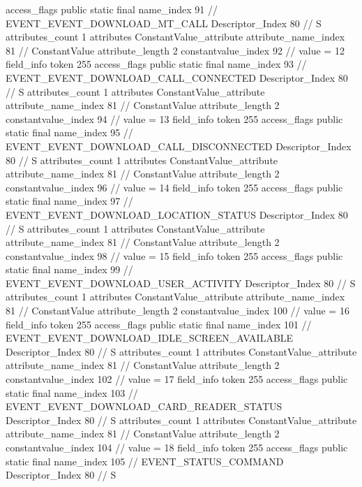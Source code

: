 {{{{{				access_flags	public static final
				name_index	91		// EVENT_EVENT_DOWNLOAD_MT_CALL
				Descriptor_Index	80		// S
				attributes_count	1
				attributes {
				ConstantValue_attribute {
					attribute_name_index	81		// ConstantValue
					attribute_length	2
					constantvalue_index	92		// value = 12
				}
				}
			}
			field_info {
				token	255
				access_flags	public static final
				name_index	93		// EVENT_EVENT_DOWNLOAD_CALL_CONNECTED
				Descriptor_Index	80		// S
				attributes_count	1
				attributes {
				ConstantValue_attribute {
					attribute_name_index	81		// ConstantValue
					attribute_length	2
					constantvalue_index	94		// value = 13
				}
				}
			}
			field_info {
				token	255
				access_flags	public static final
				name_index	95		// EVENT_EVENT_DOWNLOAD_CALL_DISCONNECTED
				Descriptor_Index	80		// S
				attributes_count	1
				attributes {
				ConstantValue_attribute {
					attribute_name_index	81		// ConstantValue
					attribute_length	2
					constantvalue_index	96		// value = 14
				}
				}
			}
			field_info {
				token	255
				access_flags	public static final
				name_index	97		// EVENT_EVENT_DOWNLOAD_LOCATION_STATUS
				Descriptor_Index	80		// S
				attributes_count	1
				attributes {
				ConstantValue_attribute {
					attribute_name_index	81		// ConstantValue
					attribute_length	2
					constantvalue_index	98		// value = 15
				}
				}
			}
			field_info {
				token	255
				access_flags	public static final
				name_index	99		// EVENT_EVENT_DOWNLOAD_USER_ACTIVITY
				Descriptor_Index	80		// S
				attributes_count	1
				attributes {
				ConstantValue_attribute {
					attribute_name_index	81		// ConstantValue
					attribute_length	2
					constantvalue_index	100		// value = 16
				}
				}
			}
			field_info {
				token	255
				access_flags	public static final
				name_index	101		// EVENT_EVENT_DOWNLOAD_IDLE_SCREEN_AVAILABLE
				Descriptor_Index	80		// S
				attributes_count	1
				attributes {
				ConstantValue_attribute {
					attribute_name_index	81		// ConstantValue
					attribute_length	2
					constantvalue_index	102		// value = 17
				}
				}
			}
			field_info {
				token	255
				access_flags	public static final
				name_index	103		// EVENT_EVENT_DOWNLOAD_CARD_READER_STATUS
				Descriptor_Index	80		// S
				attributes_count	1
				attributes {
				ConstantValue_attribute {
					attribute_name_index	81		// ConstantValue
					attribute_length	2
					constantvalue_index	104		// value = 18
				}
				}
			}
			field_info {
				token	255
				access_flags	public static final
				name_index	105		// EVENT_STATUS_COMMAND
				Descriptor_Index	80		// S
}}}}}
